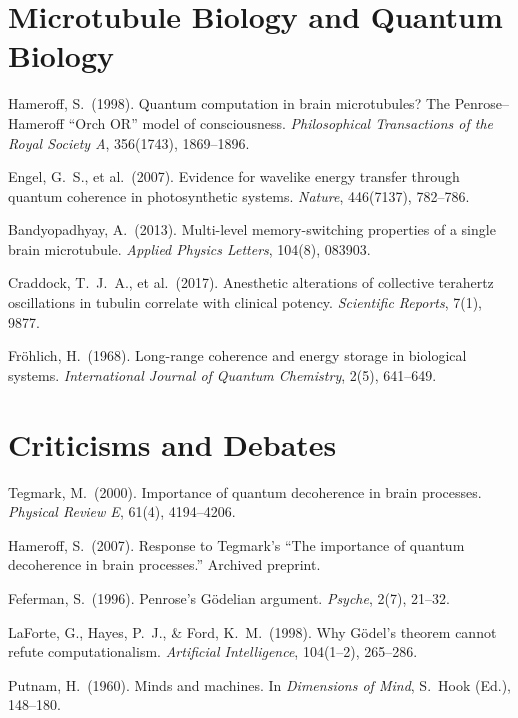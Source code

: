 \documentclass[11pt,a4paper]{report}
\begin{document}
\section*{Microtubule Biology and Quantum Biology}
\begin{enumerate}[label={[\arabic*]}, leftmargin=2.5em, start=11]
  \item Hameroff, S.\ (1998). Quantum computation in brain microtubules? The Penrose--Hameroff ``Orch OR'' model of consciousness. \textit{Philosophical Transactions of the Royal Society A}, 356(1743), 1869--1896.
  \item Engel, G.\ S., et al.\ (2007). Evidence for wavelike energy transfer through quantum coherence in photosynthetic systems. \textit{Nature}, 446(7137), 782--786.
  \item Bandyopadhyay, A.\ (2013). Multi-level memory-switching properties of a single brain microtubule. \textit{Applied Physics Letters}, 104(8), 083903.
  \item Craddock, T.\ J.\ A., et al.\ (2017). Anesthetic alterations of collective terahertz oscillations in tubulin correlate with clinical potency. \textit{Scientific Reports}, 7(1), 9877.
  \item Fr\"ohlich, H.\ (1968). Long-range coherence and energy storage in biological systems. \textit{International Journal of Quantum Chemistry}, 2(5), 641--649.
\end{enumerate}

\section*{Criticisms and Debates}
\begin{enumerate}[label={[\arabic*]}, leftmargin=2.5em, start=16]
  \item Tegmark, M.\ (2000). Importance of quantum decoherence in brain processes. \textit{Physical Review E}, 61(4), 4194--4206.
  \item Hameroff, S.\ (2007). Response to Tegmark's ``The importance of quantum decoherence in brain processes.'' Archived preprint.
  \item Feferman, S.\ (1996). Penrose's G\"odelian argument. \textit{Psyche}, 2(7), 21--32.
  \item LaForte, G., Hayes, P.\ J., \& Ford, K.\ M.\ (1998). Why G\"odel's theorem cannot refute computationalism. \textit{Artificial Intelligence}, 104(1--2), 265--286.
  \item Putnam, H.\ (1960). Minds and machines. In \textit{Dimensions of Mind}, S.\ Hook (Ed.), 148--180.
\end{enumerate}
\end{document}
